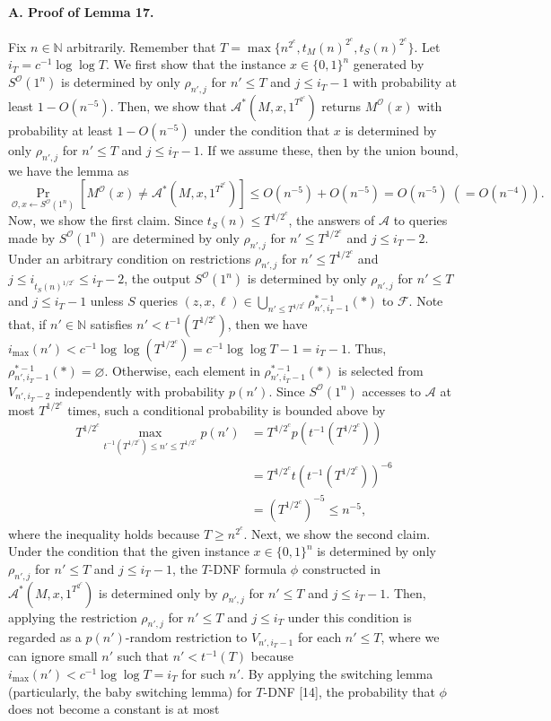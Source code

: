 \documentclass[10pt,a4paper]{article}
\begin{document}
\paragraph{A. Proof of Lemma 17.}
Fix $n\in\mathbb N$ arbitrarily. Remember that $T=\max\{n^{2^c},t_M(n)^{2^c},t_S(n)^{2^c}\}$. Let $i_T=c^{-1}\log\log T$.
We first show that the instance $x\in\{0,1\}^n$ generated by $S^{\mathcal O}(1^n)$ is determined by only $\rho_{n',j}$ for $n'\leq T$ and $j\leq i_T-1$ with probability at least $1-O(n^{-5})$. Then, we show that $\mathcal A^*(M,x,1^{T^{2^c}})$ returns $M^{\mathcal O}(x)$ with probability at least $1-O(n^{-5})$ under the condition that $x$ is determined by only $\rho_{n',j}$ for $n'\leq T$ and $j\leq i_T-1$. If we assume these, then by the union bound, we have the lemma as
\[\Pr_{\mathcal O,x\leftarrow S^{\mathcal O}(1^n)}[M^{\mathcal O}(x)\neq\mathcal A^*(M,x,1^{T^{2^c}})]\leq O(n^{-5})+O(n^{-5})=O(n^{-5})\ (=O(n^{-4})).\]
Now, we show the first claim. Since $t_S(n)\leq T^{1/2^c}$, the answers of $\mathcal A$ to queries made by $S^{\mathcal O}(1^n)$ are determined by only $\rho_{n',j}$ for $n'\leq T^{1/2^c}$ and $j\leq i_T-2$. Under an arbitrary condition on restrictions $\rho_{n',j}$ for $n'\leq T^{1/2^c}$ and $j\leq i_{t_S(n)^{1/2^c}}\leq i_T-2$, the output $S^{\mathcal O}(1^n)$ is determined by only $\rho_{n',j}$ for $n'\leq T$ and $j\leq i_T-1$ unless $S$ queries $(z,x,\ell)\in\bigcup_{n'\leq T^{1/2^c}}\rho_{n',i_T-1}^{*-1}(*)$ to $\mathcal F$. Note that, if $n'\in\mathbb N$ satisfies $n'<t^{-1}(T^{1/2^c})$, then we have $i_{\max}(n')<c^{-1}\log\log(T^{1/2^c})=c^{-1}\log\log T-1=i_T-1$. Thus, $\rho_{n',i_T-1}^{*-1}(*)=\varnothing$. Otherwise, each element in $\rho_{n',i_T-1}^{*-1}(*)$ is selected from $V_{n',i_T-2}$ independently with probability $p(n')$. Since $S^{\mathcal O}(1^n)$ accesses to $\mathcal A$ at most $T^{1/2^c}$ times, such a conditional probability is bounded above by
\begin{align*}
T^{1/2^c}\max_{t^{-1}(T^{1/2^c})\leq n'\leq T^{1/2^c}}p(n')
&=T^{1/2^c}p(t^{-1}(T^{1/2^c}))\\
&=T^{1/2^c}t(t^{-1}(T^{1/2^c}))^{-6}\\
&=(T^{1/2^c})^{-5}\leq n^{-5},
\end{align*}
where the inequality holds because $T\geq n^{2^c}$.
Next, we show the second claim. Under the condition that the given instance $x\in\{0,1\}^n$ is determined by only $\rho_{n',j}$ for $n'\leq T$ and $j\leq i_T-1$, the $T$-DNF formula $\phi$ constructed in $\mathcal A^*(M,x,1^{T^{2^c}})$ is determined only by $\rho_{n',j}$ for $n'\leq T$ and $j\leq i_T-1$. Then, applying the restriction $\rho_{n',j}$ for $n'\leq T$ and $j\leq i_T$ under this condition is regarded as a $p(n')$-random restriction to $V_{n',i_T-1}$ for each $n'\leq T$, where we can ignore small $n'$ such that $n'<t^{-1}(T)$ because $i_{\max}(n')<c^{-1}\log\log T=i_T$ for such $n'$. By applying the switching lemma (particularly, the baby switching lemma) for $T$-DNF [14], the probability that $\phi$ does not become a constant is at most
\end{document}
